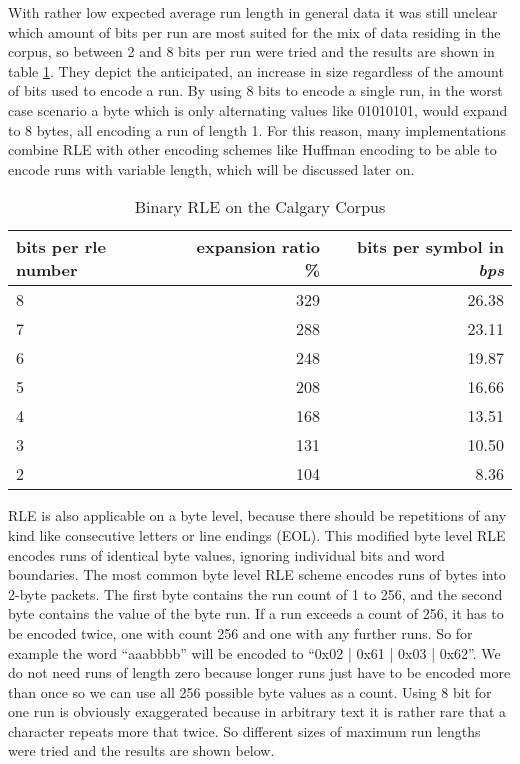 \par{
	With rather low expected average run length in general data it was still unclear which amount of bits per run are most suited for the mix of data residing in the corpus, so between 2 and 8 bits per run were tried and the results are shown in table \ref{tab:t4 simple run length eval}. They depict the anticipated, an increase in size regardless of the amount of bits used to encode a run. By using 8 bits to encode a single run, in the worst case scenario a byte which is only alternating values like 01010101, would expand to 8 bytes, all encoding a run of length 1. For this reason, many implementations combine RLE with other encoding schemes like Huffman encoding to be able to encode runs with variable length, which will be discussed later on.
}

\begin{table}[h]
	\centering
	\begin{tabular}{l|r|r}
		\label{tab:t4 simple run length eval}
		
		bits per rle number &  expansion ratio \% & bits per symbol in \textit{bps}\\
		\hline
		8 & 329 & 26.38\\
		7 & 288 & 23.11\\
		6 & 248 & 19.87\\
		5 & 208 & 16.66\\
		4 & 168 & 13.51\\
		3 & 131 & 10.50\\
		2 & 104 & 8.36\\
	\end{tabular}
	\caption{Binary RLE on the Calgary Corpus}
\end{table}

\par{
RLE is also applicable on a byte level, because there should be repetitions of any kind like consecutive letters or line endings (EOL). This modified byte level RLE encodes runs of identical byte values, ignoring individual bits and word boundaries. The most common byte level RLE scheme encodes runs of bytes into 2-byte packets. The first byte contains the run count of 1 to 256, and the second byte contains the value of the byte run. If a run exceeds a count of 256, it has to be encoded twice, one with count 256 and one with any further runs. So for example the word \enquote{aaabbbb} will be encoded to \enquote{0x02 | 0x61 | 0x03 | 0x62}. We do not need runs of length zero because longer runs just have to be encoded more than once so we can use all 256 possible byte values as a count. Using 8 bit for one run is obviously exaggerated because in arbitrary text it is rather rare that a character repeats more that twice. So different sizes of maximum run lengths were tried and the results are shown below.
}

